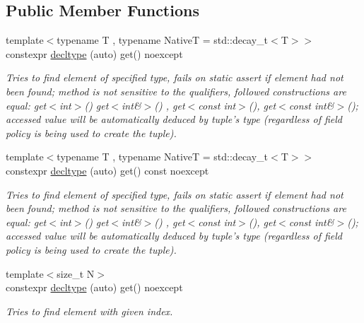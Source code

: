 \subsection*{Public Member Functions}
\begin{CompactItemize}
\item 
{\footnotesize template$<$typename T , typename NativeT  = std::decay\_\-t$<$T$>$$>$ }\\constexpr \hyperlink{classhope_1_1detail_1_1flat__tuple__impl_3_01std_1_1index__sequence_3_01_is_8_8_8_4_00_01_ts_8_8_8_4_6f82e0562ca06b099334fa7c08e0eb64}{decltype} (auto) get() noexcept
\begin{CompactList}\small\item\em Tries to find element of specified type, fails on static assert if element had not been found; method is not sensitive to the qualifiers, followed constructions are equal: get$<$int$>$() get$<$int\&$>$() , get$<$const int$>$(), get$<$const int\&$>$(); accessed value will be automatically deduced by tuple's type (regardless of field policy is being used to create the tuple). \item\end{CompactList}\item 
{\footnotesize template$<$typename T , typename NativeT  = std::decay\_\-t$<$T$>$$>$ }\\constexpr \hyperlink{classhope_1_1detail_1_1flat__tuple__impl_3_01std_1_1index__sequence_3_01_is_8_8_8_4_00_01_ts_8_8_8_4_0db8adfa32e775efc297ffd41fdda6a7}{decltype} (auto) get() const noexcept
\begin{CompactList}\small\item\em Tries to find element of specified type, fails on static assert if element had not been found; method is not sensitive to the qualifiers, followed constructions are equal: get$<$int$>$() get$<$int\&$>$() , get$<$const int$>$(), get$<$const int\&$>$(); accessed value will be automatically deduced by tuple's type (regardless of field policy is being used to create the tuple). \item\end{CompactList}\item 
{\footnotesize template$<$size\_\-t N$>$ }\\constexpr \hyperlink{classhope_1_1detail_1_1flat__tuple__impl_3_01std_1_1index__sequence_3_01_is_8_8_8_4_00_01_ts_8_8_8_4_6f82e0562ca06b099334fa7c08e0eb64}{decltype} (auto) get() noexcept
\begin{CompactList}\small\item\em Tries to find element with given index. \item\end{CompactList}\item 

\end{CompactItemize}
